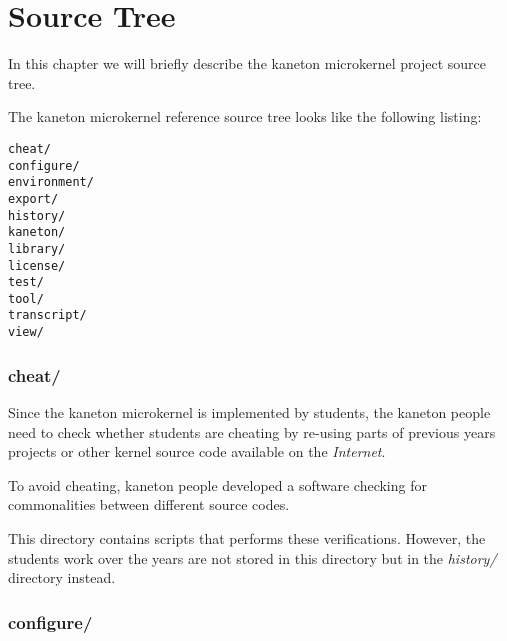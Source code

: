 %
%
%
%
%
%

%
%

\chapter{Source Tree}
\label{chapter:source tree}

In this chapter we will briefly describe the kaneton microkernel project
source tree.

\newpage

%
%

The kaneton microkernel reference source tree looks like the following
listing:

\begin{verbatim}
cheat/
configure/
environment/
export/
history/
kaneton/
library/
license/
test/
tool/
transcript/
view/
\end{verbatim}

%
%

\subsection*{cheat/}

Since the kaneton microkernel is implemented by students, the kaneton
people need to check whether students are cheating by re-using parts of
previous years projects or other kernel source code available on the
\textit{Internet}.

To avoid cheating, kaneton people developed a software checking for
commonalities between different source codes.

This directory contains scripts that performs these verifications. However,
the students work over the years are not stored in this directory but in
the \textit{history/} directory instead.

%
%

\subsection*{configure/}

